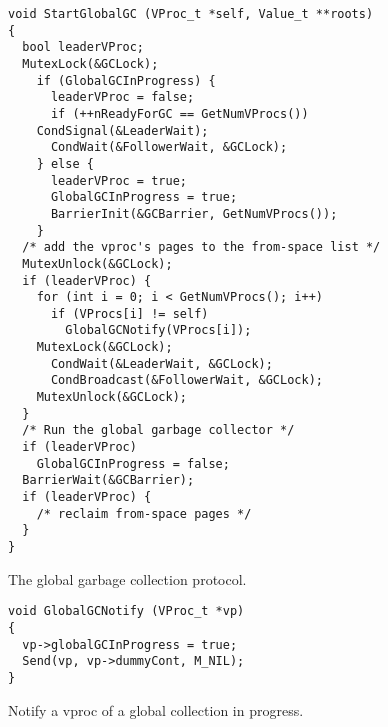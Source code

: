 \documentclass[11pt]{article}
\begin{document}
\begin{figure}
\lstset{language=C}
\lstset{commentstyle=\textit}
\lstset{numbers=left}
\begin{lstlisting}
void StartGlobalGC (VProc_t *self, Value_t **roots)
{
  bool leaderVProc;
  MutexLock(&GCLock);
    if (GlobalGCInProgress) {
      leaderVProc = false;
      if (++nReadyForGC == GetNumVProcs())
	CondSignal(&LeaderWait);
      CondWait(&FollowerWait, &GCLock);
    } else {
      leaderVProc = true;
      GlobalGCInProgress = true;
      BarrierInit(&GCBarrier, GetNumVProcs());
    }
  /* add the vproc's pages to the from-space list */
  MutexUnlock(&GCLock);
  if (leaderVProc) {
    for (int i = 0; i < GetNumVProcs(); i++)
      if (VProcs[i] != self)
        GlobalGCNotify(VProcs[i]);
    MutexLock(&GCLock);
      CondWait(&LeaderWait, &GCLock);
      CondBroadcast(&FollowerWait, &GCLock);
    MutexUnlock(&GCLock);    
  }
  /* Run the global garbage collector */
  if (leaderVProc)
    GlobalGCInProgress = false;
  BarrierWait(&GCBarrier);
  if (leaderVProc) {
    /* reclaim from-space pages */
  }
}
\end{lstlisting}
\caption{The global garbage collection protocol.}\label{fig:global-gc-protocol}
\end{figure}

\begin{figure}
\lstset{language=C}
\lstset{commentstyle=\textit}
\lstset{numbers=left}
\begin{lstlisting}
void GlobalGCNotify (VProc_t *vp)
{
  vp->globalGCInProgress = true;
  Send(vp, vp->dummyCont, M_NIL);
}
\end{lstlisting}
\caption{Notify a vproc of a global collection in progress.}\label{fig:global-gc-notify}
\end{figure}
\end{document}
